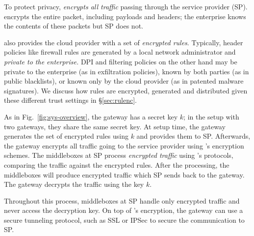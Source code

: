 To protect privacy, \sys \textit{encrypts all traffic} passing through the service provider (SP).
\sys encrypts the entire packet, including payloads and headers; the enterprise knows the contents of these packets but SP does not.

\sys also provides the cloud provider with a set of {\it encrypted rules}.
Typically, header policies like firewall rules are generated by a local network administrator and {\it private to the enterprise.}
DPI and filtering policies on the other hand may be private to the enterprise (as in exfiltration policies), known by both parties (as in  public blacklists), or known only by the cloud provider (as in  patented malware signatures).
We discuss how rules are encrypted, generated and distributed given these different trust settings in \S\ref{sec:rulenc}.

As in Fig.~\ref{fig:sys-overview}, the gateway has a secret key $k$; in the setup with two gateways, they share
the same secret key. 
At setup time, the gateway generates the set of encrypted rules using $k$ and provides them to SP.
Afterwards, the gateway encrypts all traffic going to the service provider using \sys's encryption schemes.
The middleboxes at SP process {\em encrypted traffic} using \sys's protocols, comparing the traffic against the encrypted rules. 
After the processing, the middleboxes
will produce encrypted traffic which SP sends back to the gateway. The gateway decrypts the traffic using the key $k$.

Throughout this process, middleboxes at SP handle only encrypted traffic and never access the decryption key. 
On top of \sys's encryption, the gateway can use a secure tunneling protocol, such as SSL or IPSec to secure the communication to SP.


